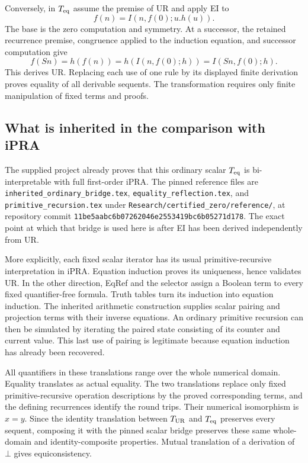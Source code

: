 \documentclass[11pt]{article}
\theoremstyle{definition}\newtheorem{definition}[theorem]{Definition}
\newcommand{\file}[1]{{\small\nolinkurl{#1}}}
\begin{document}
Conversely, in $T_{\rm eq}$ assume the premise of UR and apply EI to
\[
                       f(n)=I(n,f(0);u.h(u)).
\]
The base is the zero computation and symmetry.  At a successor, the
retained recurrence premise, congruence applied to the induction
equation, and successor computation give
\[
 f(Sn)=h(f(n))=h(I(n,f(0);h))=I(Sn,f(0);h).
\]
This derives UR.  Replacing each use of one rule by its displayed finite
derivation proves equality of all derivable sequents.  The transformation
requires only finite manipulation of fixed terms and proofs.

\subsection{What is inherited in the comparison with iPRA}
The supplied project already proves that this ordinary scalar
$T_{\rm eq}$ is bi-interpretable with full first-order iPRA.  The pinned
reference files are \file{inherited_ordinary_bridge.tex},
\file{equality_reflection.tex}, and
\file{primitive_recursion.tex} under
\file{Research/certified_zero/reference/}, at repository commit
\texttt{11be5aabc6b07262046e2553419bc6b05271d178}.
The exact point at which that bridge is used here is after EI has been
derived independently from UR.

More explicitly, each fixed scalar iterator has its usual
primitive-recursive interpretation in iPRA.  Equation induction proves
its uniqueness, hence validates UR.  In the other direction, EqRef
and the selector assign a Boolean term to every fixed quantifier-free
formula.  Truth tables turn its induction into equation induction.
The inherited arithmetic construction supplies scalar pairing and
projection terms with their inverse equations.  An ordinary primitive
recursion can then be simulated by iterating the paired state consisting
of its counter and current value.  This last use of pairing is legitimate
because equation induction has already been recovered.

All quantifiers in these translations range over the whole numerical
domain.  Equality translates as actual equality.  The two translations
replace only fixed primitive-recursive operation descriptions by the
proved corresponding terms, and the defining recurrences identify the
round trips.  Their numerical isomorphism is $x=y$.  Since the identity
translation between $T_{\rm UR}$ and $T_{\rm eq}$ preserves every sequent,
composing it with the pinned scalar bridge preserves these same whole-
domain and identity-composite properties.  Mutual translation of a
derivation of $\bot$ gives equiconsistency.
\end{document}
